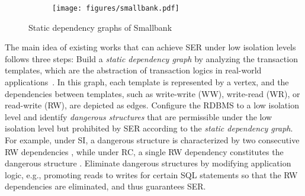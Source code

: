 \begin{figure}[t]
    \centering
    \vspace{3mm}
    \begin{minipage}{0.95\linewidth}
        \centering
        \begin{subfigure}{\linewidth}
            \texttt{[image: figures/smallbank.pdf]}
        \end{subfigure}
    \end{minipage}
    \vspace{-2mm}
    \caption{Static dependency graphs of Smallbank}
    \label{fig:SmallBank}
    \vspace{-4mm}
\end{figure}

The main idea of existing works that can achieve SER under low isolation levels follows three steps: 
 Build a {\em static dependency graph} by analyzing the transaction templates, which are the abstraction of transaction logics in real-world applications~\cite{DBLP:journals/pvldb/VandevoortK0N21, DBLP:conf/icdt/VandevoortK0N22}.  
In this graph, each template is represented by a vertex, and the dependencies between templates, such as write-write (WW), write-read (WR), or read-write (RW), are depicted as edges.
 Configure the RDBMS to a low isolation level and identify {\em dangerous structures} that are permissible under the low isolation level but prohibited by SER according to the {\it static dependency graph}.
For example, under SI, a dangerous structure is characterized by two consecutive RW dependencies \cite{DBLP:conf/pods/Fekete05, DBLP:journals/sigmod/FeketeOO04}, while under RC, a single RW dependency constitutes the dangerous structure \cite{DBLP:conf/aiccsa/AlomariF15, DBLP:journals/pvldb/VandevoortK0N21}.
 Eliminate dangerous structures by modifying application logic, e.g., promoting reads to writes for certain SQL statements so that the RW dependencies are eliminated, and thus guarantees SER.

